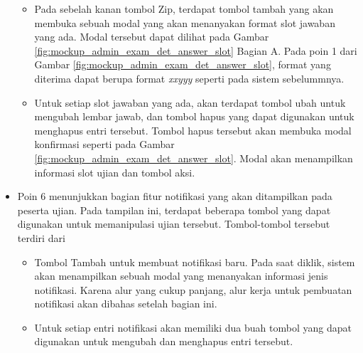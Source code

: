 \begin{itemize}
\begin{itemize}
                \item Pada sebelah kanan tombol Zip, terdapat tombol tambah yang
                    akan membuka sebuah modal yang akan menanyakan format slot
                    jawaban yang ada. Modal tersebut dapat dilihat pada Gambar
                    \ref{fig:mockup_admin_exam_det_answer_slot} Bagian A.
                    Pada poin 1 dari Gambar \ref{fig:mockup_admin_exam_det_answer_slot},
                    format yang diterima dapat berupa format \textit{xxyyy}
                    seperti pada sistem sebelummnya.
                    
                \item Untuk setiap slot jawaban yang ada, akan terdapat tombol
                    ubah untuk mengubah lembar jawab, dan tombol hapus yang
                    dapat digunakan untuk menghapus entri tersebut. Tombol hapus
                    tersebut akan membuka modal konfirmasi seperti pada Gambar 
                    \ref{fig:mockup_admin_exam_det_answer_slot}. Modal akan
                    menampilkan informasi slot ujian dan tombol aksi.
            \end{itemize}
            
        \item Poin 6 menunjukkan bagian fitur notifikasi yang akan ditampilkan
            pada peserta ujian. Pada tampilan ini, terdapat beberapa tombol yang
            dapat digunakan untuk memanipulasi ujian tersebut. Tombol-tombol
            tersebut terdiri dari
                \begin{itemize}
                    \item Tombol Tambah untuk membuat notifikasi baru. Pada saat
                        diklik, sistem akan menampilkan sebuah modal yang
                        menanyakan informasi jenis notifikasi. Karena alur yang
                        cukup panjang, alur kerja untuk pembuatan notifikasi
                        akan dibahas setelah bagian ini.
                        
                    \item Untuk setiap entri notifikasi akan memiliki dua buah
                        tombol yang dapat digunakan untuk mengubah dan menghapus
                        entri tersebut.
                \end{itemize}
            

\end{itemize}

